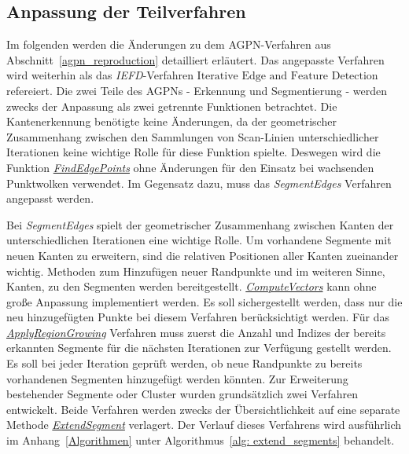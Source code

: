 \subsection{Anpassung der Teilverfahren}
Im folgenden werden die Änderungen zu dem AGPN-Verfahren aus Abschnitt~\ref{agpn_reproduction} detailliert erläutert. Das angepasste Verfahren wird weiterhin als das \textit{IEFD}-Verfahren \textit{\(\text{Iterative Edge and Feature Detection}\)}refereiert. Die zwei Teile des AGPNs - Erkennung und Segmentierung - werden zwecks der Anpassung als zwei getrennte Funktionen betrachtet. Die Kantenerkennung benötigte keine Änderungen, da der geometrischer Zusammenhang zwischen den Sammlungen von Scan-Linien unterschiedlicher Iterationen keine wichtige Rolle für diese Funktion spielte. Deswegen wird die Funktion \textit{\hyperref[alg:find_edge_points]{FindEdgePoints}} ohne Änderungen für den Einsatz bei wachsenden Punktwolken verwendet. Im Gegensatz dazu, muss das \textit{SegmentEdges} Verfahren angepasst werden.

Bei \textit{SegmentEdges} spielt der geometrischer Zusammenhang zwischen Kanten der unterschiedlichen Iterationen eine wichtige Rolle. Um vorhandene Segmente mit neuen Kanten zu erweitern, sind die relativen Positionen aller Kanten zueinander wichtig. Methoden zum Hinzufügen neuer Randpunkte und im weiteren Sinne, Kanten, zu den Segmenten werden bereitgestellt. \textit{\hyperref[alg:compute_vectors]{ComputeVectors}} kann ohne große Anpassung implementiert werden. Es soll sichergestellt werden, dass nur die neu hinzugefügten Punkte bei diesem Verfahren berücksichtigt werden. Für das \textit{\hyperref[alg:apply_region_growing]{ApplyRegionGrowing}} Verfahren muss zuerst die Anzahl und Indizes der bereits erkannten Segmente für die nächsten Iterationen zur Verfügung gestellt werden. Es soll bei jeder Iteration geprüft werden, ob neue Randpunkte zu bereits vorhandenen Segmenten hinzugefügt werden könnten. Zur Erweiterung bestehender Segmente oder Cluster wurden grundsätzlich zwei Verfahren entwickelt. Beide Verfahren werden zwecks der Übersichtlichkeit auf eine separate Methode \textit{\hyperref[alg: extend_segments]{ExtendSegment}} verlagert. Der Verlauf dieses Verfahrens wird ausführlich im Anhang~\ref{Algorithmen} unter Algorithmus~\ref{alg: extend_segments} behandelt.

